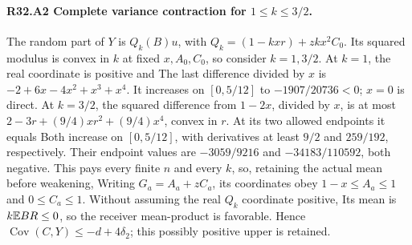 \paragraph{R32.A2 Complete variance contraction for \(1\le k\le3/2\).}
The random part of \(Y\) is \(Q_k(B)u\), with
\(Q_k=(1-kxr)+zkx^2C_0\). Its squared modulus is convex in \(k\)
at fixed \(x,\allowbreak A_0,\allowbreak C_0\), so consider \(k=1,\allowbreak 3/2\).
At \(k=1\), the real coordinate is positive and
The last difference divided by \(x\) is \(-2+6x-4x^2+x^3+x^4\).
It increases on \([0,\allowbreak 5/12]\) to \(-1907/20736<0\); \(x=0\) is direct.
At \(k=3/2\), the squared difference from \(1-2x\), divided by \(x\),
is at most \(2-3r+(9/4)xr^2+(9/4)x^4\), convex in \(r\).
At its two allowed endpoints it equals
Both increase on \([0,\allowbreak 5/12]\), with derivatives at least \(9/2\) and
\(259/192\), respectively. Their endpoint values are \(-3059/9216\)
and \(-34183/110592\), both negative. This pays every finite \(n\)
and every \(k\), so, retaining the actual mean before weakening,
Writing \(G_a=A_a+zC_a\), its coordinates obey \(1-x\le A_a\le1\) and
\(0\le C_a\le1\). Without assuming the real \(Q_k\)
coordinate positive,
Its mean is \(k\mathbb E BR\le0\), so the receiver mean-product is favorable.
Hence \(\operatorname{Cov}(C,\allowbreak Y)\le-d+4\delta_2\); this possibly positive
upper is retained.

